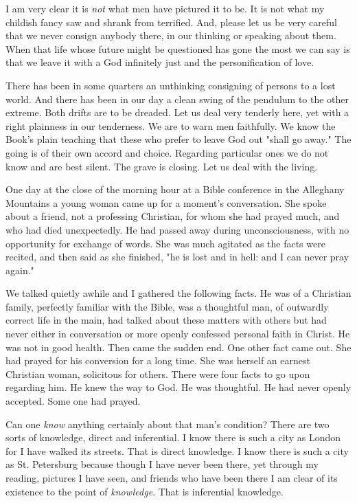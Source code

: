 I am very clear it is \textit{not} what men have pictured it to be. It is not
what my childish fancy saw and shrank from terrified. And, please let us
be very careful that we never consign anybody there, in our thinking or
speaking about them. When that life whose future might be questioned has
gone the most we can say is that we leave it with a God infinitely just
and the personification of love.

There has been in some quarters an unthinking consigning of persons to a
lost world. And there has been in our day a clean swing of the pendulum
to the other extreme. Both drifts are to be dreaded. Let us deal very
tenderly here, yet with a right plainness in our tenderness. We are to
warn men faithfully. We know the Book's plain teaching that these who
prefer to leave God out "shall go away." The going is of their own accord
and choice. Regarding particular ones we do not know and are best silent.
The grave is closing. Let us deal with the living.

One day at the close of the morning hour at a Bible conference in the
Alleghany Mountains a young woman came up for a moment's conversation. She
spoke about a friend, not a professing Christian, for whom she had prayed
much, and who had died unexpectedly. He had passed away during
unconsciousness, with no opportunity for exchange of words. She was much
agitated as the facts were recited, and then said as she finished, "he is
lost and in hell: and I can never pray again."

We talked quietly awhile and I gathered the following facts. He was of a
Christian family, perfectly familiar with the Bible, was a thoughtful man,
of outwardly correct life in the main, had talked about these matters with
others but had never either in conversation or more openly confessed
personal faith in Christ. He was not in good health. Then came the sudden
end. One other fact came out. She had prayed for his conversion for a long
time. She was herself an earnest Christian woman, solicitous for others.
There were four facts to go upon regarding him. He knew the way to God. He
was thoughtful. He had never openly accepted. Some one had prayed.

Can one \textit{know} anything certainly about that man's condition? There are
two sorts of knowledge, direct and inferential. I know there is such a
city as London for I have walked its streets. That is direct knowledge. I
know there is such a city as St. Petersburg because though I have never
been there, yet through my reading, pictures I have seen, and friends who
have been there I am clear of its existence to the point of \textit{knowledge}.
That is inferential knowledge.

